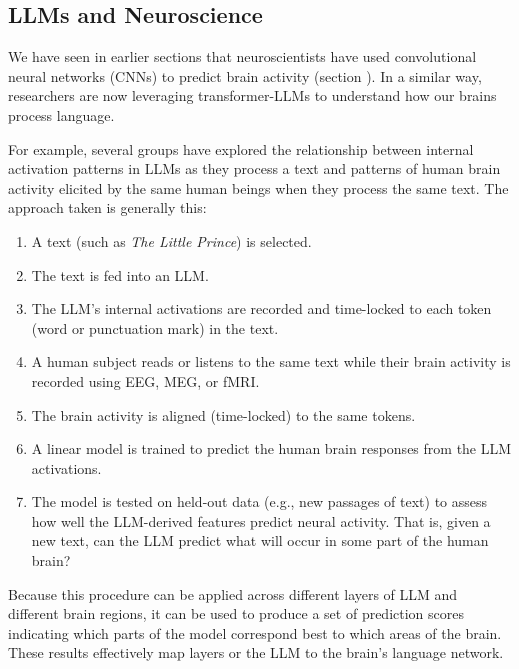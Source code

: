 \subsection{LLMs and Neuroscience}

We have seen in earlier sections that neuroscientists have used convolutional
neural networks (CNNs) to predict brain activity (section
). In a similar way, researchers are now leveraging
transformer-LLMs to understand how our brains process language. 

For example, several groups \cite{pasquiou2022neural, schrimpf2021neural,
caucheteux2022brains} have explored the relationship between internal
activation patterns in LLMs as they process a text and patterns of human brain
activity elicited by the same  human beings when they process the same text.
The approach taken is generally this:  
\begin{enumerate}
  \item A text (such as \emph{The Little Prince}) is selected.
  \item The text is fed into an LLM.
  \item The LLM's internal activations are recorded and time-locked to each
  token (word or punctuation mark) in the text.
  \item A human subject reads or listens to the same text while their brain
  activity is recorded using EEG, MEG, or fMRI.
  \item The brain activity is  aligned (time-locked) to the same tokens.
  \item A linear model is trained to predict the human brain responses from the
  LLM activations.
  \item The model is tested on held-out data (e.g., new passages of text) to
  assess how well the LLM-derived features predict neural activity. That is,
  given a new text, can the LLM predict what will occur in some part of the
  human brain?
\end{enumerate}

Because this procedure can be applied across different layers of LLM and
different brain regions, it can be used to produce  a set of prediction scores
indicating which parts of the model correspond best to which areas of the
brain. These results effectively map layers or the LLM to the brain's language
network.

